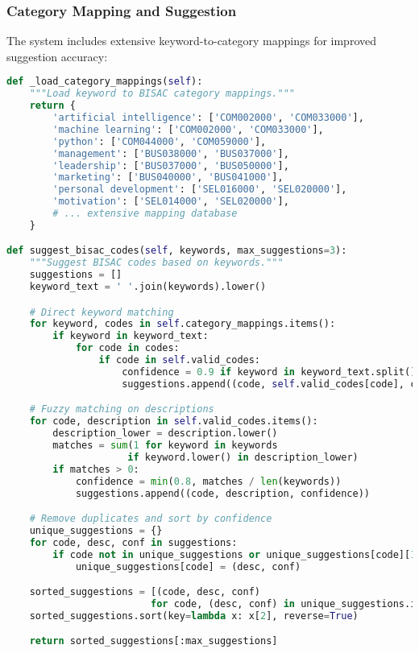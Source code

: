 \documentclass{article}
\begin{document}
\subsubsection{Category Mapping and Suggestion}

The system includes extensive keyword-to-category mappings for improved suggestion accuracy:

\begin{lstlisting}[language=python, caption=Category Mapping System]
def _load_category_mappings(self):
    """Load keyword to BISAC category mappings."""
    return {
        'artificial intelligence': ['COM002000', 'COM033000'],
        'machine learning': ['COM002000', 'COM033000'],
        'python': ['COM044000', 'COM059000'],
        'management': ['BUS038000', 'BUS037000'],
        'leadership': ['BUS037000', 'BUS050000'],
        'marketing': ['BUS040000', 'BUS041000'],
        'personal development': ['SEL016000', 'SEL020000'],
        'motivation': ['SEL014000', 'SEL020000'],
        # ... extensive mapping database
    }

def suggest_bisac_codes(self, keywords, max_suggestions=3):
    """Suggest BISAC codes based on keywords."""
    suggestions = []
    keyword_text = ' '.join(keywords).lower()

    # Direct keyword matching
    for keyword, codes in self.category_mappings.items():
        if keyword in keyword_text:
            for code in codes:
                if code in self.valid_codes:
                    confidence = 0.9 if keyword in keyword_text.split() else 0.7
                    suggestions.append((code, self.valid_codes[code], confidence))

    # Fuzzy matching on descriptions
    for code, description in self.valid_codes.items():
        description_lower = description.lower()
        matches = sum(1 for keyword in keywords
                     if keyword.lower() in description_lower)
        if matches > 0:
            confidence = min(0.8, matches / len(keywords))
            suggestions.append((code, description, confidence))

    # Remove duplicates and sort by confidence
    unique_suggestions = {}
    for code, desc, conf in suggestions:
        if code not in unique_suggestions or unique_suggestions[code][1] < conf:
            unique_suggestions[code] = (desc, conf)

    sorted_suggestions = [(code, desc, conf)
                         for code, (desc, conf) in unique_suggestions.items()]
    sorted_suggestions.sort(key=lambda x: x[2], reverse=True)

    return sorted_suggestions[:max_suggestions]
\end{lstlisting}
\end{document}
